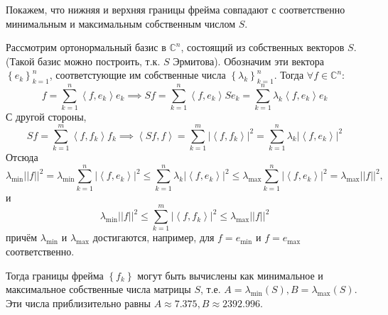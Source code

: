 \documentclass[a4paper,article,10pt]{extarticle}
\begin{document}
Покажем, что нижняя и верхняя границы фрейма совпадают с соответственно минимальным и максимальным собственным числом $S$.

Рассмотрим ортонормальный базис в $\mathbb{C}^n$, состоящий из собственных векторов $S$. (Такой базис можно построить, т.к. $S$ Эрмитова). Обозначим эти вектора $\left\{e_k\right\}_{k=1}^n$, соответстующие им собственные числа $\left\{ \lambda_k\right\}_{k=1}^n$. Тогда $\forall f \in \mathbb{C}^n$:
\[
	f = \sum_{k=1}^n \left<f, e_k \right> e_k \implies Sf = \sum_{k=1}^n \left<f, e_k \right> S e_k = \sum_{k=1}^n \lambda_k \left<f, e_k \right> e_k
\]
С другой стороны,
\[
	Sf = \sum_{k=1}^m \left<f, f_k\right> f_k \implies \left<Sf, f\right> = \sum_{k=1}^m \left| \left< f, f_k \right> \right|^2 = \sum_{k=1}^n \lambda_k \left|\left<f, e_k \right> \right|^2
\]
Отсюда
\[
	\lambda_{\min} \left| \left| f \right| \right|^2 = \lambda_{\min} \sum_{k=1}^n \left| \left< f, e_k \right> \right|^2 \le \sum_{k=1}^n \lambda_k \left| \left< f, e_k \right> \right|^2 \le \lambda_{\max} \sum_{k=1}^n \left| \left< f, e_k \right> \right|^2 = \lambda_{\max} \left| \left| f \right| \right|^2,
\]
и
\[
	\lambda_{\min} \left| \left| f \right| \right|^2 \le \sum_{k=1}^m \left| \left< f, f_k\right> \right|^2 \le \lambda_{\max} \left| \left| f \right| \right|^2
\]
причём $\lambda_{\min}$ и $\lambda_{\max}$ достигаются, например, для $f = e_{\min}$ и $f = e_{\max}$ соответственно.

Тогда границы фрейма $\left\{ f_k\right\}$ могут быть вычислены как минимальное и максимальное собственные числа матрицы $S$, т.е. $A = \lambda_{\min{}} \left(S\right), B = \lambda_{\max{}} \left( S\right)$. Эти числа приблизительно равны $A \approx 7.375, B \approx 2392.996$.
\end{document}
